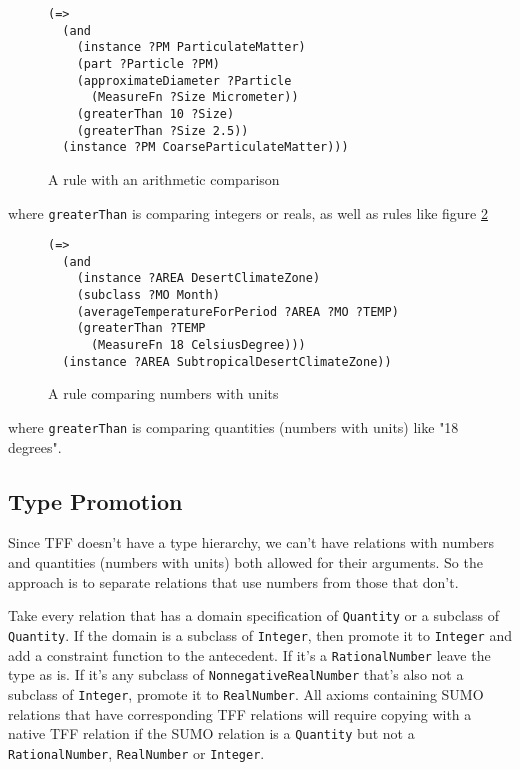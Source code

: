 \documentclass{article}
\begin{document}
\begin{figure}[H]
\begin{framed}
\begin{verbatim}
(=>
  (and
    (instance ?PM ParticulateMatter)
    (part ?Particle ?PM)
    (approximateDiameter ?Particle
      (MeasureFn ?Size Micrometer))
    (greaterThan 10 ?Size)
    (greaterThan ?Size 2.5))
  (instance ?PM CoarseParticulateMatter)))
\end{verbatim}
\end{framed}
\caption{A rule with an arithmetic comparison}
\label{fig:Particulate}
\end{figure}

where \texttt{greaterThan} is comparing integers or reals, as well as rules like
figure \ref{fig:Desert}

\begin{figure}[H]
\begin{framed}
\begin{verbatim}
(=>
  (and
    (instance ?AREA DesertClimateZone)
    (subclass ?MO Month)
    (averageTemperatureForPeriod ?AREA ?MO ?TEMP)
    (greaterThan ?TEMP
      (MeasureFn 18 CelsiusDegree)))
  (instance ?AREA SubtropicalDesertClimateZone))
\end{verbatim}
\end{framed}
\caption{A rule comparing numbers with units}
\label{fig:Desert}
\end{figure}

where \texttt{greaterThan} is comparing quantities (numbers with units) like "18
degrees".

\subsection{Type Promotion}

Since TFF doesn't have a type hierarchy, we can't have relations with numbers
and quantities (numbers with units) both allowed for their arguments. So the
approach is to separate relations that use numbers from those that don't.  

Take every relation that has a domain specification of \texttt{Quantity} or a
subclass of \texttt{Quantity}.  If the domain is a subclass of \texttt{Integer},
then promote it to \texttt{Integer} and add a constraint function to the
antecedent.  If it's a \texttt{RationalNumber} leave the type as is.  If it's
any subclass of \texttt{NonnegativeRealNumber} that's also not a subclass of
\texttt{Integer}, promote it to \texttt{RealNumber}.  All axioms containing SUMO
relations that have corresponding TFF relations will require copying with a
native TFF relation if the SUMO relation is a \texttt{Quantity} but not a
\texttt{RationalNumber}, \texttt{RealNumber} or \texttt{Integer}.  
\end{document}
